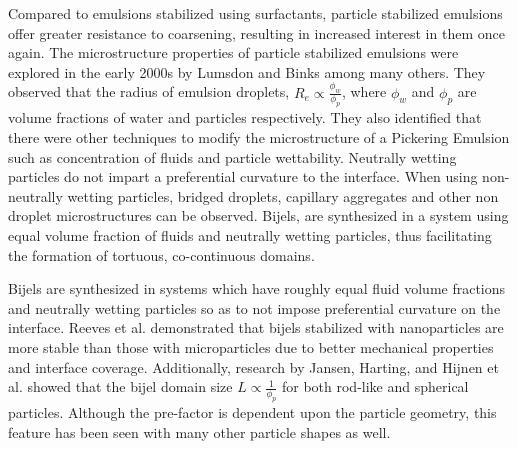 Compared to emulsions stabilized using surfactants, particle stabilized emulsions offer greater resistance to coarsening, resulting in increased interest in 
them once again. The microstructure properties of particle stabilized emulsions were explored in the early 2000s by Lumsdon and Binks among many others. They 
observed that the radius of emulsion droplets, $R_e \propto \frac{\phi_w}{\phi_p}$, where $\phi_w$ and $\phi_p$ are volume fractions of water and particles 
respectively. \cite{binks_pickering_2001} They also identified that there were other techniques to modify the microstructure of a Pickering Emulsion 
such as concentration of fluids and particle wettability. Neutrally wetting particles do not impart a preferential curvature to the interface. When 
using non-neutrally wetting particles, bridged droplets, capillary aggregates and other non droplet microstructures can be observed. Bijels, are synthesized 
in a system using equal volume fraction of fluids and neutrally wetting particles, thus facilitating the formation of tortuous, co-continuous domains. 

Bijels are synthesized in systems which have roughly equal fluid volume fractions and neutrally wetting particles so as to not impose preferential 
curvature on the interface. \cite{stratford_colloidal_2005, herzig_bicontinuous_2007, lee_bicontinuous_2010, jansen_bijels_2011, velankar_non-equilibrium_2015} 
Reeves et al. demonstrated that bijels stabilized with nanoparticles are more stable than those with microparticles due to better mechanical properties and 
interface coverage. \cite{reeves_particle-size_2015}  Additionally, research by Jansen, Harting, and Hijnen et al. showed that the bijel domain size 
$L \propto \frac{1}{\phi_p}$ for both rod-like and spherical particles. Although the pre-factor is dependent upon the particle geometry, this feature 
has been seen with many other particle shapes as well. \cite{hijnen_bijels_2015, madivala_exploiting_2009, gunther_timescales_2014, daware_emulsions_2015, 
loudet_capillary_2005, cheng_shape-anisotropic_2013}


